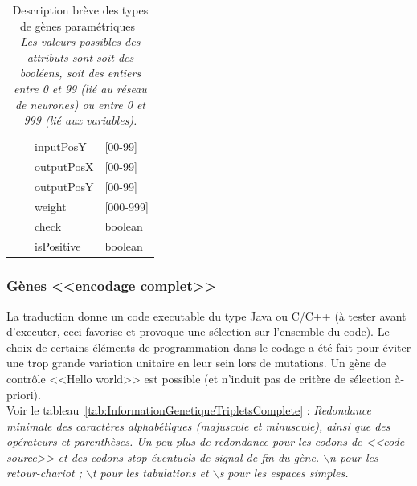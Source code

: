 \documentclass[11pt,twoside,a4paper]{article}
\begin{document}
\begin{table}[ht]
\begin{center}
\begin{scriptsize}
\begin{tabular}{|p{}|c|p{}|p{}|}
	\cline{3-4} %
								&				&	inputPosY	& [00-99] \\
	\cline{3-4} %
								&				&	outputPosX	& [00-99] \\
	\cline{3-4} %
								&				&	outputPosY	& [00-99] \\
	\cline{3-4} %
								&				&	weight		& [000-999] \\
	\cline{3-4} %
								&				&	check		& boolean \\
	\cline{3-4} %
								&				&	isPositive	& boolean \\
	\hline \hline
	
	\end{tabular}
	\end{scriptsize} \end{center}
	\caption[Description br{\`e}ve des types de g{\`e}nes param{\'e}triques]
		{ \scriptsize Description br{\`e}ve des types de g{\`e}nes param{\'e}triques~\\
		\emph{Les valeurs possibles des attributs sont soit des bool{\'e}ens, soit des entiers entre 0 et 99 (li{\'e} au r{\'e}seau de neurones) ou entre 0 et 999 (li{\'e} aux variables). }}
	\label{tab:briefDescriptionGeneTypes}
\end{table}


\subsubsection{G{\`e}nes <<encodage complet>>}

La traduction donne un code executable du type Java ou C/C++ ({\`a} tester avant d'executer, ceci favorise et provoque une s{\'e}lection sur l'ensemble du code). Le choix de certains {\'e}l{\'e}ments de programmation dans le codage a {\'e}t{\'e} fait pour {\'e}viter une trop grande variation unitaire en leur sein lors de mutations. Un g{\`e}ne de contr{\^o}le <<Hello world>> est possible (et n'induit pas de crit{\`e}re de s{\'e}lection {\`a}-priori).~\\

Voir le tableau~\ref{tab:InformationGenetiqueTripletsComplete} : \emph{Redondance minimale des caract{\`e}res alphab{\'e}tiques (majuscule et minuscule), ainsi que des op{\'e}rateurs et parenth{\`e}ses. Un peu plus de redondance pour les codons de <<code source>> et des codons stop {\'e}ventuels de signal de fin du g{\`e}ne. $\backslash$n pour les retour-chariot ; $\backslash$t pour les tabulations et $\backslash$s pour les espaces simples. }
\end{document}

